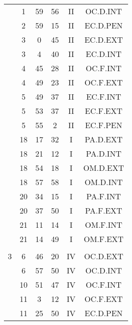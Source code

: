 \documentclass[12pt, a4paper]{article}
\begin{document}
\begin{multicols}{3}
{\begin{tabular}{c c c c c c}
	 	 	 	 & 1 & 59 & 56 & II & OC.D.INT\\%
	 	 	 	 & 2 & 59 & 15 & II & EC.D.PEN\\%
	 	 	 	 & 3 & 0 & 45 & II & EC.D.EXT\\%
	 	 	 	 & 3 & 4 & 40 & II & EC.D.INT\\%
	 	 	 	 & 4 & 45 & 28 & II & OC.F.INT\\%
	 	 	 	 & 4 & 49 & 23 & II & OC.F.EXT\\%
	 	 	 	 & 5 & 49 & 37 & II & EC.F.INT\\%
	 	 	 	 & 5 & 53 & 37 & II & EC.F.EXT\\%
	 	 	 	 & 5 & 55 & 2 & II & EC.F.PEN\\%
	 	 	 	 & 18 & 17 & 32 & I & PA.D.EXT\\%
	 	 	 	 & 18 & 21 & 12 & I & PA.D.INT\\%
	 	 	 	 & 18 & 54 & 18 & I & OM.D.EXT\\%
	 	 	 	 & 18 & 57 & 58 & I & OM.D.INT\\%
	 	 	 	 & 20 & 34 & 15 & I & PA.F.INT\\%
	 	 	 	 & 20 & 37 & 50 & I & PA.F.EXT\\%
	 	 	 	 & 21 & 11 & 14 & I & OM.F.INT\\%
	 	 	 	 & 21 & 14 & 49 & I & OM.F.EXT\\%
	 	 	 	 & & & & & \\%
	 	 	 	3 & 6 & 46 & 20 & IV & OC.D.EXT\\%
	 	 	 	 & 6 & 57 & 50 & IV & OC.D.INT\\%
	 	 	 	 & 10 & 51 & 47 & IV & OC.F.INT\\%
	 	 	 	 & 11 & 3 & 12 & IV & OC.F.EXT\\%
	 	 	 	 & 11 & 25 & 50 & IV & EC.D.PEN\\%

\end{tabular}}
\end{multicols}
\end{document}
